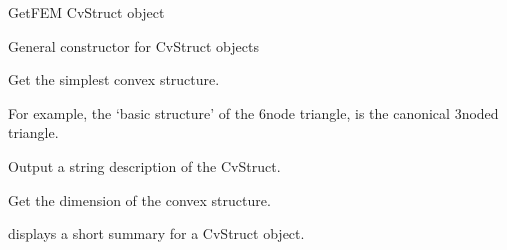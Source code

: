 \documentclass[a4paper,11pt,english]{sphinxmanual}
\begin{document}
\begin{fulllineitems}
\label{\detokenize{python/cmdref_CvStruct:getfem.CvStruct}}
GetFEM CvStruct object

General constructor for CvStruct objects

\begin{fulllineitems}
\label{\detokenize{python/cmdref_CvStruct:getfem.CvStruct.basic_structure}}
Get the simplest convex structure.

For example, the ‘basic structure’ of the 6\sphinxhyphen{}node triangle, is the
canonical 3\sphinxhyphen{}noded triangle.

\end{fulllineitems}


\begin{fulllineitems}
\label{\detokenize{python/cmdref_CvStruct:getfem.CvStruct.char}}
Output a string description of the CvStruct.

\end{fulllineitems}


\begin{fulllineitems}
\label{\detokenize{python/cmdref_CvStruct:getfem.CvStruct.dim}}
Get the dimension of the convex structure.

\end{fulllineitems}


\begin{fulllineitems}
\label{\detokenize{python/cmdref_CvStruct:getfem.CvStruct.display}}
displays a short summary for a CvStruct object.

\end{fulllineitems}


\end{fulllineitems}
\end{document}
